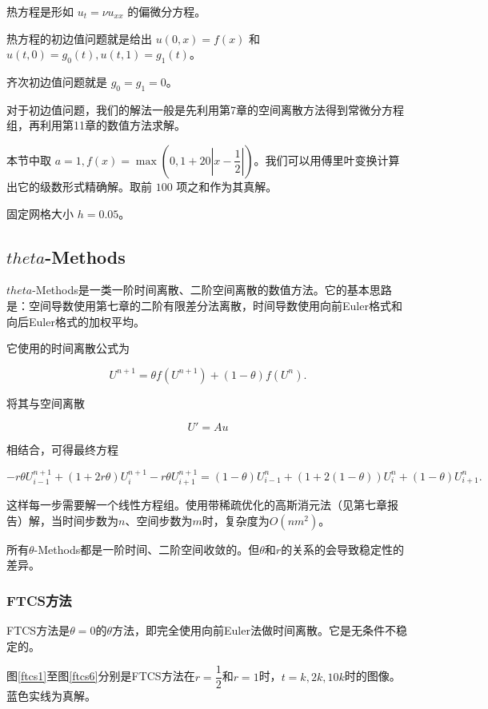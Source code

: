 \documentclass{ctexart}
\begin{document}
热方程是形如 $u_t=\nu u_{xx}$ 的偏微分方程。

热方程的初边值问题就是给出 $u(0,x)=f(x)$ 和 $u(t,0)=g_0(t),u(t,1)=g_1(t)$。

齐次初边值问题就是 $g_0=g_1=0$。

对于初边值问题，我们的解法一般是先利用第7章的空间离散方法得到常微分方程组，再利用第11章的数值方法求解。

本节中取 $a=1,f(x) = \max(0,1+20|x-\dfrac 12|)$。我们可以用傅里叶变换计算出它的级数形式精确解。取前 $100$ 项之和作为其真解。

固定网格大小 $h=0.05$。

\subsection{$theta$-Methods}

$theta$-Methods是一类一阶时间离散、二阶空间离散的数值方法。它的基本思路是：空间导数使用第七章的二阶有限差分法离散，时间导数使用向前Euler格式和向后Euler格式的加权平均。

它使用的时间离散公式为

\begin{equation}
	U^{n+1} = \theta f(U^{n+1}) + (1-\theta) f(U^n).
\end{equation}

将其与空间离散

\begin{equation}
	U'=Au
\end{equation}

相结合，可得最终方程

\begin{equation}
	-r\theta U_{i-1}^{n+1} + (1+2r\theta) U_i^{n+1} - r\theta U_{i+1}^{n+1} = (1-\theta) U_{i-1}^n + (1+2(1-\theta)) U_i^n + (1-\theta) U_{i+1}^n.
\end{equation}

这样每一步需要解一个线性方程组。使用带稀疏优化的高斯消元法（见第七章报告）解，当时间步数为$n$、空间步数为$m$时，复杂度为$O(nm^2)$。

所有$\theta$-Methods都是一阶时间、二阶空间收敛的。但$\theta$和$r$的关系的会导致稳定性的差异。

\subsubsection{FTCS方法}

FTCS方法是$\theta=0$的$\theta$方法，即完全使用向前Euler法做时间离散。它是无条件不稳定的。

图\ref{ftcs1}至图\ref{ftcs6}分别是FTCS方法在$r=\dfrac 12$和$r=1$时，$t=k,2k,10k$时的图像。蓝色实线为真解。
\end{document}
